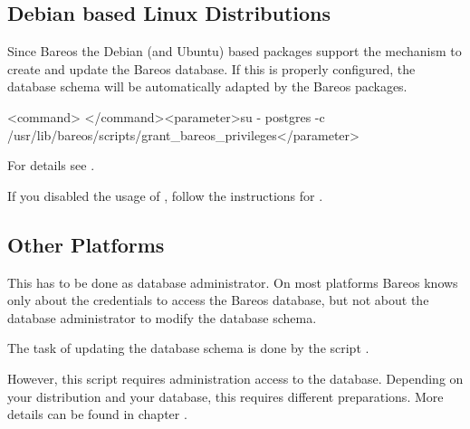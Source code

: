 \subsection{Debian based Linux Distributions}

Since Bareos  the Debian (and Ubuntu) based packages support the  mechanism to create and update the Bareos database.
If this is properly configured, the database schema will be automatically adapted by the Bareos packages.

\begin{commands}{}
<command> </command><parameter>su - postgres -c /usr/lib/bareos/scripts/grant_bareos_privileges</parameter>
\end{commands}
For details see .

If you disabled the usage of , 
follow the instructions for .

\subsection{Other Platforms}
    \label{sec:UpdateDatabaseOtherDistributions}

This has to be done as database administrator.
On most platforms Bareos knows only about the credentials to access the Bareos database,
but not about the database administrator to modify the database schema.

The task of updating the database schema is done by the script
.

However, this script requires administration access to the database.
Depending on your distribution and your database, this requires different preparations.
More details can be found in chapter .


